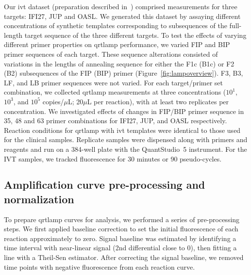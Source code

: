 \documentclass[../thesis.tex]{subfiles}
\begin{document}
Our \gls{ivt}  dataset (preparation described in~\citet{remmel_diagnostic_2022}) comprised measurements for three targets: {IFI27}, {JUP} and {OASL}. We generated this dataset by assaying different concentrations of synthetic  templates corresponding to subsequences of the full-length target sequence of the three different targets. To test the effects of varying different primer properties on \gls{qrtlamp} performance, we varied FIP and BIP primer sequences of each target. These sequence alterations consisted of variations in the lengths of annealing sequence for either the F1c (B1c) or F2 (B2) subsequences of the FIP (BIP) primer (Figure~\ref{fig:lampoverview}). F3, B3, LF, and LB primer sequences were not varied. For each target/primer set combination, we collected \gls{qrtlamp} measurements at three  concentrations ($10^1$, $10^3$, and $10^5$ copies/$\mu$L; 20$\mu$L per reaction), with at least two replicates per concentration. We investigated effects of changes in FIP/BIP primer sequence in 35, 48 and 63 primer combinations for {IFI27}, {JUP}, and {OASL} respectively. Reaction conditions for \gls{qrtlamp} with \gls{ivt}  templates were identical to those used for the clinical samples. Replicate samples were dispensed along with primers and reagents and run on a 384-well plate with the QuantStudio\texttrademark~5 instrument. For the IVT samples, we tracked fluorescence for 30 minutes or 90 pseudo-cycles.


\subsection{Amplification curve pre-processing and normalization \label{sec:curvenormalisation}}
To prepare \gls{qrtlamp} curves for analysis, we performed a series of pre-processing steps. We first applied baseline correction to set the initial fluorescence of each reaction approximately to zero. Signal baseline was estimated by identifying a time interval with near-linear signal (2nd differential close to 0), then fitting a line with a Theil-Sen estimator. After correcting the signal baseline, we removed time points with negative fluorescence from each reaction curve.
\end{document}
